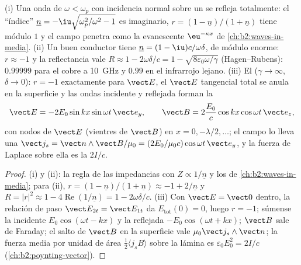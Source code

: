 \begin{proposition}\label{prop:b2:wave-interfaces:conductors}
(i) Una onda de $\omega < \omega_p$ con incidencia normal sobre un  se refleja
totalmente: el ``índice'' $\underline n = -\iu\sqrt{\omega_p^2/\omega^2 - 1}$ es imaginario,
$r = (1 - \underline n)/(1 + \underline n)$ tiene módulo $1$ y el campo penetra
como la evanescente $\eu^{-\kappa x}$ de \cref{ch:b2:waves-in-media}. (ii) Un
buen conductor tiene $\underline n = (1 - \iu)c/\omega\delta$, de módulo enorme: $r \approx
-1$ y la reflectancia vale $R \approx 1 - 2\omega\delta/c = 1 - \sqrt{8\varepsilon_0\omega/\gamma}$
(Hagen--Rubens): $0.99999$ para el cobre a \qty{10}{GHz} y $0.99$ en el infrarrojo
lejano. (iii) El \emph{} ($\gamma \to \infty$, $\delta \to 0$):
$r = -1$ exactamente para $\vect E$, el $\vect E$ tangencial total se anula en
la superficie y las ondas incidente y reflejada forman la 
\[
\vect E = -2E_0\sin kx\sin\omega t\,\vect e_y , \qquad
\vect B = 2\frac{E_0}c\cos kx\cos\omega t\,\vect e_z ,
\]
con nodos de $\vect E$ (vientres de $\vect B$) en $x = 0, -\lambda/2, \dots$; el
campo lo lleva una \emph{} $\vect j_s = \vect n\wedge\vect B/
\mu_0 = (2E_0/\mu_0c)\cos\omega t\,\vect e_y$, y la fuerza de Laplace sobre ella es
la  $2I/c$.
\end{proposition}

\begin{proof}
(i) y (ii): la regla de las impedancias con $Z \propto 1/\underline n$ y los  de \cref{ch:b2:waves-in-media}; para (ii), $r = (1 - \underline n)/(1 +
\underline n) \approx -1 + 2/\underline n$ y $R = |r|^2 \approx 1 - 4\operatorname{Re}(1/
\underline n) = 1 - 2\omega\delta/c$. (iii) Con $\vect E = \vect 0$ dentro, la
relación de paso $\vect E_{2t} = \vect E_{1t}$ da $E_{\text{tot}}(0) = 0$, luego $r =
-1$; súmense la incidente $E_0\cos(\omega t - kx)$ y la reflejada $-E_0\cos(\omega t + kx)$;
$\vect B$ sale de Faraday; el salto de $\vect B$ en la superficie vale $\mu_0\vect j_s
\wedge\vect n$; la fuerza media por unidad de área $\tfrac12\langle j_sB\rangle$ sobre
la lámina es $\varepsilon_0E_0^2 = 2I/c$ (\cref{ch:b2:poynting-vector}).
\end{proof}

